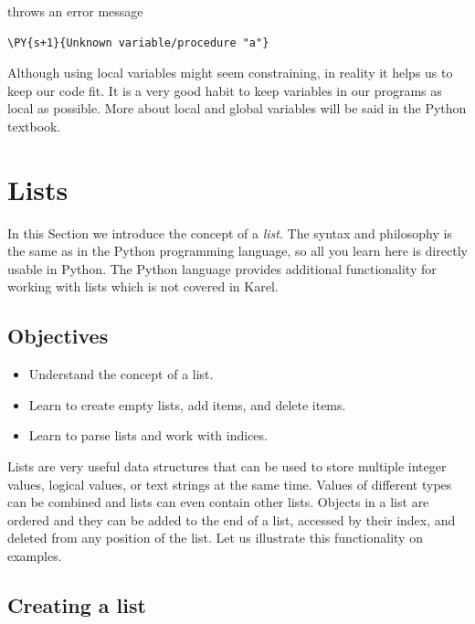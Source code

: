 \noindent
throws an error message \\

\begin{ybox}
\begin{Verbatim}[commandchars=\\\{\}]
\PY{s+1}{Unknown variable/procedure "a"} 
\end{Verbatim}
\end{ybox}
\vspace{6mm}

\noindent
Although using local variables might seem constraining, in reality it helps us 
to keep our code fit. It is a very good habit to keep variables in our programs 
as local as possible. More about local and global variables will be said in 
the Python textbook.

\section{Lists}

In this Section we introduce the concept of a {\em list}. 
The syntax and philosophy is the same as in the Python programming 
language, so all you learn here is directly usable in Python.
The Python language provides additional functionality for
working with lists which is not covered in Karel.

\subsection[\ \ Objectives]{Objectives} 
 
\begin{itemize}
\item Understand the concept of a list.
\item Learn to create empty lists, add items, and delete items.
\item Learn to parse lists and work with indices.
\end{itemize}
Lists are very useful data structures that can be used to store multiple 
integer values, logical values, or text strings at the same time. 
Values of different types can be combined and lists can even contain other lists.
Objects in a list are ordered and they can be added to the end of a list, 
accessed by their index, and deleted from any position of the list. Let us 
illustrate this functionality on examples.

\subsection[\ \ Creating a list]{Creating a list}

